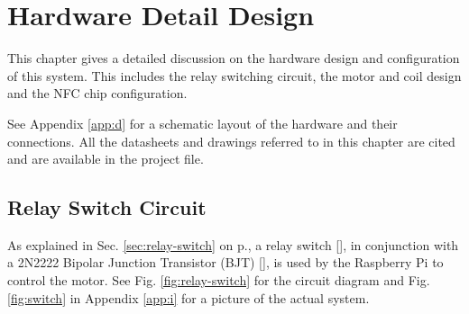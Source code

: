 \chapter{Hardware Detail Design}
\label{chap:5}

This chapter gives a detailed discussion on the hardware design and
configuration of this system. This includes the relay switching circuit, the
motor and coil design and the NFC chip configuration.

See Appendix \ref{app:d} for a schematic layout of the hardware and their
connections. All the datasheets and drawings referred to in this chapter are
cited and are available in the project file. 

\section{Relay Switch Circuit}
\label{sec:detail-switch}

As explained in Sec. \ref{sec:relay-switch} on p.\pageref{sec:relay-switch}, a relay
switch [\cite{manual:relay-specs}], in conjunction with a 2N2222
Bipolar Junction Transistor (BJT) [\cite{maunual:transistor-datasheet}], is used
by the Raspberry Pi to control the motor. See Fig.
\ref{fig:relay-switch} for the circuit diagram and Fig. \ref{fig:switch} in
Appendix \ref{app:i} for a picture of the actual system.

